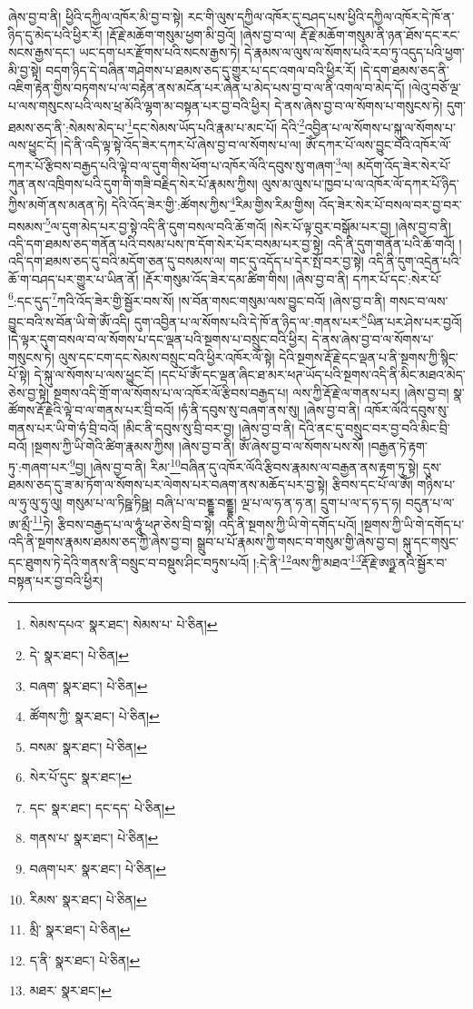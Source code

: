 ཞེས་བྱ་བ་ནི། ཕྱིའི་དཀྱིལ་འཁོར་མི་བྱ་བ་སྟེ། རང་གི་ལུས་དཀྱིལ་འཁོར་དུ་བཤད་པས་ཕྱིའི་དཀྱིལ་འཁོར་དེ་ཁོ་ན་ཉིད་དུ་མེད་པའི་ཕྱིར་རོ། །རྡོ་རྗེ་མཆོག་གསུམ་ཕྱག་མི་བྱའོ། །ཞེས་བྱ་བ་ལ། རྡོ་རྗེ་མཆོག་གསུམ་ནི་ཉན་ཐོས་དང་རང་སངས་རྒྱས་དང་། ཡང་དག་པར་རྫོགས་པའི་སངས་རྒྱས་ཏེ། དེ་རྣམས་ལ་ལུས་ལ་སོགས་པའི་རབ་ཏུ་འདུད་པའི་ཕྱག་མི་བྱ་སྟེ། བདག་ཉིད་དེ་བཞིན་གཤེགས་པ་ཐམས་ཅད་དུ་གྱུར་པ་དང་འགལ་བའི་ཕྱིར་རོ། །དེ་དག་ཐམས་ཅད་ནི་འཇིག་རྟེན་གྱིས་བཏགས་པ་ལ་བརྟེན་ནས་མངོན་པར་ཞེན་པ་མེད་པས་བྱ་བ་ལ་ནི་འགལ་བ་མེད་དོ། །ལེའུ་བཅོ་ལྔ་པ་ལས་གསུངས་པའི་ལས་ཕྲ་མོའི་ལྷག་མ་བསྟན་པར་བྱ་བའི་ཕྱིར། དེ་ནས་ཞེས་བྱ་བ་ལ་སོགས་པ་གསུངས་ཏེ། དུག་ཐམས་ཅད་ནི་:སེམས་མེད་པ་\footnote{སེམས་དཔའ་  སྣར་ཐང་། སེམས་པ་  པེ་ཅིན། }དང་སེམས་ཡོད་པའི་རྣམ་པ་མང་པོ། དེའི་\footnote{དེ་  སྣར་ཐང་།  པེ་ཅིན། }འབྱིན་པ་ལ་སོགས་པ་སྐུ་ལ་སོགས་པ་ལས་ཕྱུང་ངོ། །དེ་ནི་འདི་ལྟ་སྟེ་འོད་ཟེར་དཀར་པོ་ཞེས་བྱ་བ་ལ་སོགས་པ་ལ། ཨོཾ་དཀར་པོ་ལས་བྱུང་བའི་འཁོར་ལོ་དཀར་པོ་རྩིབས་བརྒྱད་པའི་ལྟེ་བ་ལ་དུག་གིས་ཕོག་པ་འཁོར་ལོའི་དབུས་སུ་གཞག་\footnote{བཞག་  སྣར་ཐང་།  པེ་ཅིན། }ལ། མདོག་འོད་ཟེར་སེར་པོ་ཀུན་ནས་འཁྲིགས་པའི་དུག་གི་གཟི་བརྗིད་སེར་པོ་རྣམས་ཀྱིས། ལུས་མ་ལུས་པ་ཁྱབ་པ་ལ་འཁོར་ལོ་དཀར་པོ་ཉིད་ཀྱིས་མགོ་ནས་མནན་ཏེ། དེའི་འོད་ཟེར་གྱི་:ཚོགས་ཀྱིས་\footnote{ཚོགས་ཀྱི་  སྣར་ཐང་།  པེ་ཅིན། }རིམ་གྱིས་རིམ་གྱིས། འོད་ཟེར་སེར་པོ་བསལ་བར་བྱ་བར་བསམས་\footnote{བསམ་  སྣར་ཐང་།  པེ་ཅིན། }ལ་དུག་མེད་པར་བྱ་སྟེ་འདི་ནི་དུག་བསལ་བའི་ཆོ་གའོ། །སེར་པོ་ལྟ་བུར་བསྒོམ་པར་བྱ། །ཞེས་བྱ་བ་ནི། འདི་དག་ཐམས་ཅད་གནོན་པའི་བསམ་པས་ཁ་དོག་སེར་པོར་བསམ་པར་བྱ་སྟེ། འདི་ནི་དུག་གནོན་པའི་ཆོ་གའོ། །འདི་དག་ཐམས་ཅད་དུ་བའི་མདོག་ཅན་དུ་བསམས་ལ། གང་དུ་འདོད་པ་དེར་སྤོ་བར་བྱ་སྟེ། འདི་ནི་དུག་འདྲེན་པའི་ཆོ་ག་བཤད་པར་གྱུར་པ་ཡིན་ནོ། །རྡོར་གསུམ་འོད་ཟེར་དམ་ཚིག་གིས། །ཞེས་བྱ་བ་ནི། དཀར་པོ་དང་:སེར་པོ་\footnote{སེར་པོ་དུང་  སྣར་ཐང་། }:དང་དུད་\footnote{དང་  སྣར་ཐང་། དང་དད་  པེ་ཅིན། }ཀའི་འོད་ཟེར་གྱི་སྦྱོར་བས་སོ། །ས་བོན་གསང་གསུམ་ལས་བྱུང་བའོ། །ཞེས་བྱ་བ་ནི། གསང་བ་ལས་བྱུང་བའི་ས་བོན་ཡི་གེ་ཨོཾ་འདི། དུག་འབྱིན་པ་ལ་སོགས་པའི་དེ་ཁོ་ན་ཉིད་ལ་:གནས་པར་\footnote{གནས་པ་  སྣར་ཐང་།  པེ་ཅིན། }ཡིན་པར་ཤེས་པར་བྱའོ། །དེ་ལྟར་དུག་བསལ་བ་ལ་སོགས་པ་དང་ལྡན་པའི་སྔགས་པ་བསྲུང་བའི་ཕྱིར། དེ་ནས་ཞེས་བྱ་བ་ལ་སོགས་པ་གསུངས་ཏེ། ལུས་དང་ངག་དང་སེམས་བསྲུང་བའི་ཕྱིར་འཁོར་ལོ་སྟེ། དེའི་སྔགས་རྡོ་རྗེ་དང་ལྡན་པ་ནི་སྔགས་ཀྱི་སྙིང་པོ་སྟེ། དེ་སྐུ་ལ་སོགས་པ་ལས་ཕྱུང་ངོ། །དང་པོ་ཨོཾ་དང་ལྡན་ཞིང་ཐ་མར་ཕཊ་ཡོད་པའི་སྔགས་འདི་ནི་མིང་མཐའ་མེད་ཅེས་བྱ་སྟེ། སྔགས་འདི་གྲོ་ག་ལ་སོགས་པ་ལ་འཁོར་ལོ་རྩིབས་བརྒྱད་པ། ལས་ཀྱི་རྡོ་རྗེ་ལ་གནས་པར། །ཞེས་བྱ་བ། སྣ་ཚོགས་རྡོ་རྗེའི་ལྟེ་བ་ལ་གནས་པར་བྲི་བའོ། །ཧཾ་ནི་དབུས་སུ་བཞག་ནས་སུ། །ཞེས་བྱ་བ་ནི། འཁོར་ལོའི་དབུས་སུ་གནས་པར་ཡི་གེ་ཧཾ་བྲི་བའོ། །མིང་ནི་དབུས་སུ་བྲི་བར་བྱ། །ཞེས་བྱ་བ་ནི། དེའི་ནང་དུ་བསྲུང་བར་བྱ་བའི་མིང་བྲི་བའོ། །སྔགས་ཀྱི་ཡི་གེའི་ཚིག་རྣམས་ཀྱིས། །ཞེས་བྱ་བ་ནི། ཨོཾ་ཞེས་བྱ་བ་ལ་སོགས་པས་སོ། །བརྒྱན་ཏེ་རྟག་ཏུ་:གཞག་པར་\footnote{བཞག་པར་  སྣར་ཐང་།  པེ་ཅིན། }བྱ། །ཞེས་བྱ་བ་ནི། རིམ་\footnote{རིམས་  སྣར་ཐང་།  པེ་ཅིན། }བཞིན་དུ་འཁོར་ལོའི་རྩིབས་རྣམས་ལ་བརྒྱན་ནས་རྟག་ཏུ་སྟེ། དུས་ཐམས་ཅད་དུ་ཟ་མ་ཏོག་ལ་སོགས་པར་ལེགས་པར་བཞག་ནས་མཆོད་པར་བྱ་སྟེ། རྩིབས་དང་པོ་ལ་ཨོཾ། གཉིས་པ་ལ་ཧུ་ལུ་ཧུ་ལུ། གསུམ་པ་ལ་ཏིཥྛ་ཏིཥྛ། བཞི་པ་ལ་བནྡྷ་བནྡྷ། ལྔ་པ་ལ་ཧ་ན་ཧ་ན། དྲུག་པ་ལ་ད་ཧ་ད་ཧ། བདུན་པ་ལ་ཨ་མྲྀ་\footnote{མྲི་  སྣར་ཐང་།  པེ་ཅིན། }ཏེ། རྩིབས་བརྒྱད་པ་ལ་ཧཱུཾ་ཕཊ་ཅེས་བྲི་བ་སྟེ། འདི་ནི་སྔགས་ཀྱི་ཡི་གེ་དགོད་པའོ། །སྔགས་ཀྱི་ཡི་གེ་དགོད་པ་འདི་ནི་སྔགས་རྣམས་ཐམས་ཅད་ཀྱི་ཞེས་བྱ་བ། སྒྲུབ་པ་པོ་རྣམས་ཀྱི་གསང་བ་གསུམ་གྱི་ཞེས་བྱ་བ། སྐུ་དང་གསུང་དང་ཐུགས་ཏེ་དེའི་གནས་ནི་བསྲུང་བ་བསྡུས་ཤིང་བཏུས་པའོ། །:དེ་ནི་\footnote{ད་ནི་  སྣར་ཐང་།  པེ་ཅིན། }ལས་ཀྱི་མཐའ་\footnote{མཐར་  སྣར་ཐང་། }རྡོ་རྗེ་ཨཉྫ་ནའི་སྦྱོར་བ་བསྟན་པར་བྱ་བའི་ཕྱིར། 